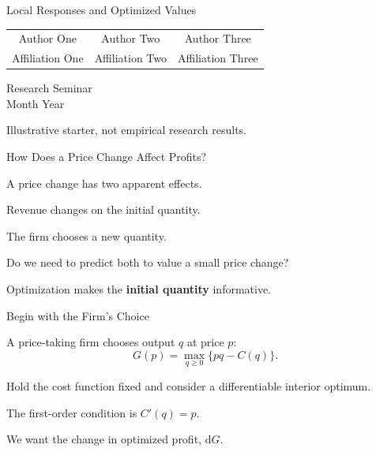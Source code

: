 \documentclass[10pt,aspectratio=169]{beamer}
\newcommand{\dd}{\mathrm{d}}
\begin{document}
\begin{frame}[plain,noframenumbering,label=title]
\vspace{8mm}
\begin{center}
{\Large\color{BQBlue}Local Responses and Optimized Values\par}
\vspace{10mm}
\begin{tabular}{ccc}
Author One & Author Two & Author Three\\[2pt]
{\footnotesize Affiliation One} & {\footnotesize Affiliation Two} & {\footnotesize Affiliation Three}
\end{tabular}\par
\vspace{8mm}
{\small Research Seminar\\[3pt]Month Year}
\end{center}
\vfill
{\tiny Illustrative starter, not empirical research results.}
\end{frame}

\begin{frame}[label=main_question]{How Does a Price Change Affect Profits?}
\begin{BQList}
\item<1-> A price change has two apparent effects.
\begin{BQSub}
\item Revenue changes on the initial quantity.
\item The firm chooses a new quantity.
\end{BQSub}
\item<2-> Do we need to predict both to value a small price change?
\item<3-> Optimization makes the \textbf{initial quantity} informative.
\end{BQList}
\end{frame}


\begin{frame}[label=main_setup]{Begin with the Firm's Choice}
\begin{BQCompact}
\item<1-> A price-taking firm chooses output $q$ at price $p$:
\[G(p)=\max_{q\geq0}\{pq-C(q)\}.\]
\item<2-> Hold the cost function fixed and consider a differentiable interior optimum.
\begin{BQSub}
\item The first-order condition is $C'(q)=p$.
\end{BQSub}
\item<3-> We want the change in optimized profit, $\dd G$.
\end{BQCompact}
\end{frame}
\end{document}
